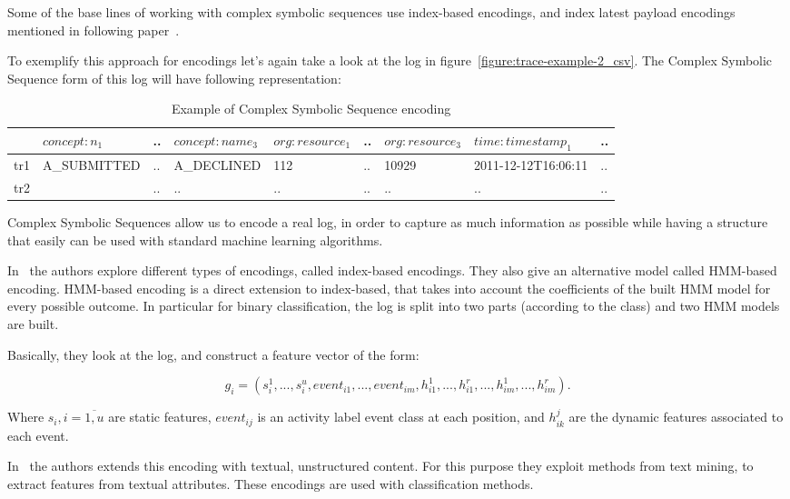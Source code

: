 Some of the base lines of working with complex symbolic sequences use index-based encodings, and index latest payload encodings mentioned in following paper~\cite{Leontjeva2015}.   

To exemplify this approach for encodings let's again take a look at the log in figure~\ref{figure:trace-example-2_csv}. The Complex Symbolic Sequence form of this log will have following representation:

\begin{table}[h]
	\centering
	\begin{tabular}{| l | l | l | l | l | l | l | l | l |}
		\hline
		& $concept:n_{1}$ & .. & $concept:name_{3}$ & $org:resource_{1}$ & .. & $org:resource_{3}$ & $time:timestamp_{1}$ & .. \\	
		\hline
		tr1 & A\_SUBMITTED & .. & A\_DECLINED &  112 & .. & 10929 &  2011-12-12T16:06:11 & ..  \\
		tr2 &  & .. & .. & .. & .. & ..  & .. & ..  \\
		\hline
	\end{tabular}
	\caption{Example of Complex Symbolic Sequence encoding}
	\label{tab:complesymbseq_log_example}
\end{table}

Complex Symbolic Sequences allow us to encode a real log, in order to capture as much information as possible while having a structure that easily can be used with standard machine learning algorithms.

In~\cite{Leontjeva2015} the authors explore different types of encodings, called index-based encodings. They also give an alternative model called HMM-based encoding. HMM-based encoding is a direct extension to index-based, that takes into account the coefficients of the built HMM model for every possible outcome. In particular for binary classification, the log is split into two parts (according to the class) and two HMM models are built.

Basically, they look at the log, and construct a feature vector of the form:

\[g_i = (s_i^1,...,s_i^u,event_{i1},...,event_{im},h_{i1}^1,...,h_{i1}^r,...,h_{im}^1,...,h_{im}^r).\]

Where $s_i, i=\overline{1,u}$ are static features, $event_{ij}$ is an activity label event class at each position, and $h_{ik}^{j}$ are the dynamic features associated to each event. 

In~\cite{DBLP:conf/bpm/TeinemaaDMF16} the authors extends this encoding with textual, unstructured content. For this purpose they exploit methods from text mining, to extract features from textual attributes. These encodings are used with classification methods.

